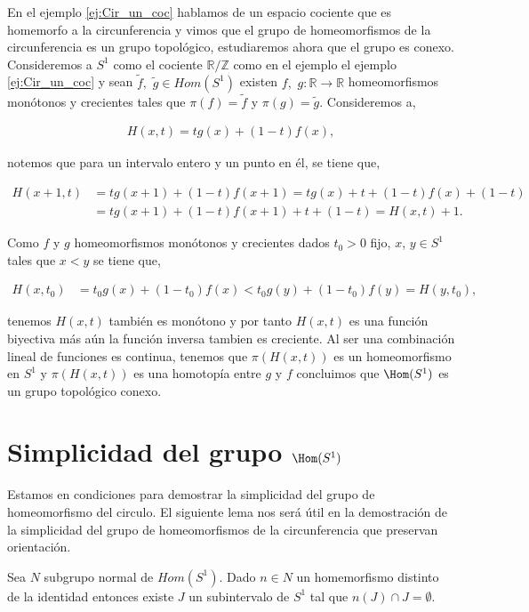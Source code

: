  
  En el ejemplo \ref{ej:Cir_un_coc} hablamos de un espacio cociente que es homemorfo a la circunferencia y vimos que el grupo de homeomorfismos de la circunferencia es un grupo topológico, estudiaremos ahora que el grupo es conexo. Consideremos a $S^1$ como el cociente $\mathbb{R} / \mathbb{Z}$ como en el ejemplo el ejemplo \ref{ej:Cir_un_coc} y sean $\tilde{f},$ $\tilde{g} \in Hom(S^1)$ existen $f,$ $g: \mathbb{R} \to \mathbb{R}$ homeomorfismos monótonos y crecientes tales que $\pi(f)=\tilde{f}$ y $\pi(g)=\tilde{g}$. Consideremos a,

\begin{align*}
H(x,t)=tg(x)+(1-t)f(x),
\end{align*}

notemos que para un intervalo entero y un punto en él, se tiene que, 

\begin{align*}
H(x+1,t) & = tg(x+1)+(1-t)f(x+1)= tg(x)+t+(1-t)f(x)+(1-t) \\
& = tg(x+1)+(1-t)f(x+1) + t +(1-t)= H(x,t)+1.
\end{align*} 

Como $f$ y $g$ homeomorfismos  monótonos y crecientes dados $t_0 >0$ fijo, $x$, $y \in S^1$ tales que $x <y$ se tiene que, 

\begin{align*}
H(x,t_0) & = t_0g(x)+(1-t_0)f(x) < t_0g(y)+(1-t_0)f(y)=H(y,t_0),
\end{align*} 

tenemos $H(x,t)$ también es monótono y por tanto $H(x,t)$ es una función biyectiva más aún la función inversa tambien es creciente. Al ser una combinación lineal de funciones es continua, tenemos que $\pi(H(x,t))$ es un homeomorfismo en $S^1$ y $\pi(H(x,t))$ es una homotopía entre $g$ y $f$ concluimos que $\Hom(S^1)$ es un grupo topológico conexo. 

\section*{Simplicidad del grupo $\Hom(S^1)$}
Estamos en condiciones para demostrar la simplicidad del grupo de homeomorfismo del circulo. El siguiente lema nos será útil en la demostración de la simplicidad del grupo de homeomorfismos de la circunferencia que preservan orientación. 


\begin{lm}
Sea $N$ subgrupo normal de $Hom(S^1)$. Dado $n \in N$ un homemorfismo distinto de la identidad entonces existe $J$ un subintervalo de $S^1$ tal que  $
n(J) \cap J = \emptyset.$
\end{lm}

